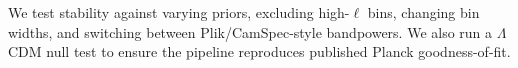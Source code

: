 
We test stability against varying priors, excluding high-$\ell$ bins, changing bin widths, and switching between Plik/CamSpec-style bandpowers. 
We also run a $\Lambda$CDM null test to ensure the pipeline reproduces published Planck goodness-of-fit.
